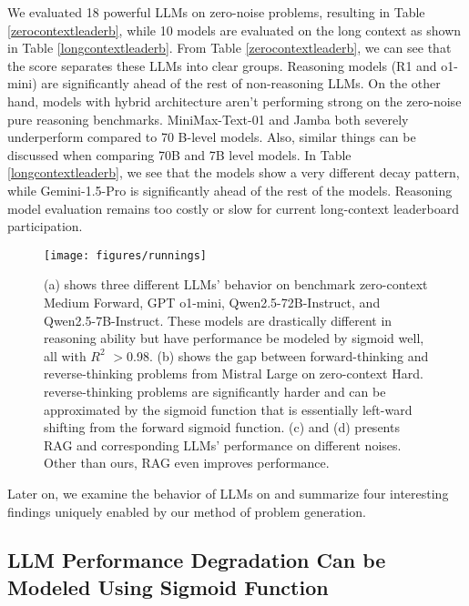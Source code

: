 We evaluated 18 powerful LLMs on zero-noise problems, resulting in Table \ref{zerocontextleaderb}, while 10 models are evaluated on the long context as shown in Table \ref{longcontextleaderb}. 
From Table \ref{zerocontextleaderb}, we can see that the score separates these LLMs into clear groups. Reasoning models (R1 and o1-mini) are significantly ahead of the rest of non-reasoning LLMs. On the other hand, models with hybrid architecture aren't performing strong on the zero-noise pure reasoning benchmarks. MiniMax-Text-01 and Jamba both severely underperform compared to 70 B-level models. Also, similar things can be discussed when comparing 70B and 7B level models. In Table \ref{longcontextleaderb}, we see that the models show a very different decay pattern, while Gemini-1.5-Pro is significantly ahead of the rest of the models. 
Reasoning model evaluation remains too costly or slow for current long-context leaderboard participation. 

\begin{figure*}
    \texttt{[image: figures/runnings]} 
     \vspace{-6mm}
    \caption{(a) shows three different LLMs' behavior on \sysb benchmark zero-context Medium Forward, GPT o1-mini, Qwen2.5-72B-Instruct, and Qwen2.5-7B-Instruct. These models are drastically different in reasoning ability but have performance be modeled by sigmoid well, all with $R^2$ $>$0.98. (b) shows the gap between forward-thinking and reverse-thinking problems from Mistral Large on zero-context Hard. reverse-thinking problems are significantly harder and can be approximated by the sigmoid function that is essentially left-ward shifting from the forward sigmoid function. (c) and (d) presents RAG and corresponding LLMs' performance on different noises. Other than ours, RAG even improves performance.} 
    \label{xprmnt} 
    \vspace{-2mm}
\end{figure*} 

Later on, we examine the behavior of LLMs on \sysb and summarize four interesting findings uniquely enabled by our method of problem generation. 
\vspace{-3mm} 

\subsection{LLM Performance Degradation Can be Modeled Using Sigmoid Function} 
\label{sigmoid} 

